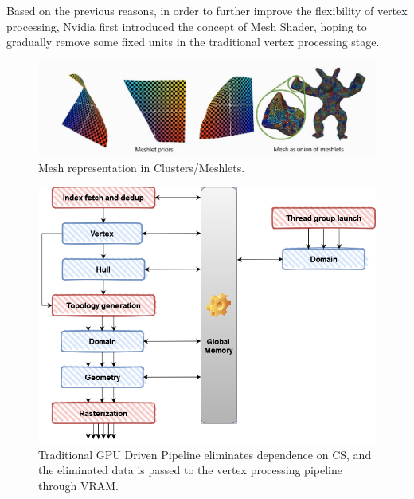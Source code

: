 \documentclass[10pt,journal,compsoc]{IEEEtran}
\begin{document}
\par Based on the previous reasons, in order to further improve the flexibility of vertex processing, Nvidia first introduced the concept of Mesh Shader, hoping to gradually remove some fixed units in the traditional vertex processing stage.

\begin{figure}[H]
    \centering
    \includegraphics[scale=0.35]{img/meshlets.jpg}
    \caption{Mesh representation in Clusters/Meshlets\cite{cluster}.}
    \label{fig:meshlets}
\end{figure}

\begin{figure}[H]
    \centering
    \includegraphics[scale=0.26]{img/diagram1.png}
    \caption{Traditional GPU Driven Pipeline eliminates dependence on CS, and the eliminated data is passed to the vertex processing pipeline through VRAM.}
    \label{fig:diagram1}
\end{figure}
\end{document}
